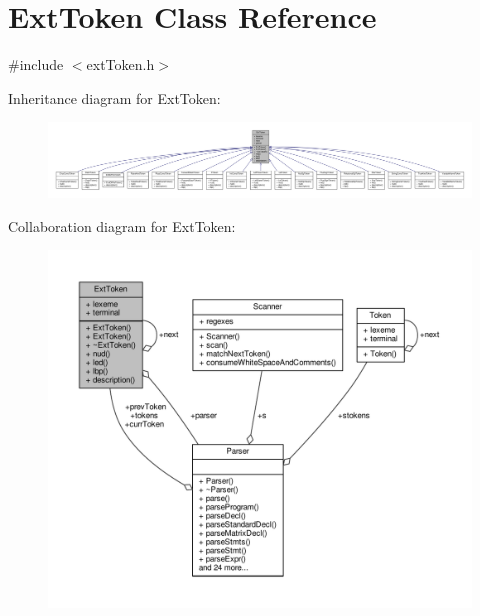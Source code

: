 \hypertarget{classExtToken}{\section{Ext\-Token Class Reference}
\label{classExtToken}
}


{\ttfamily \#include $<$ext\-Token.\-h$>$}



Inheritance diagram for Ext\-Token\-:\nopagebreak
\begin{figure}[H]
\begin{center}
\leavevmode
\includegraphics[width=350pt]{classExtToken__inherit__graph}
\end{center}
\end{figure}


Collaboration diagram for Ext\-Token\-:\nopagebreak
\begin{figure}[H]
\begin{center}
\leavevmode
\includegraphics[width=350pt]{classExtToken__coll__graph}
\end{center}
\end{figure}
